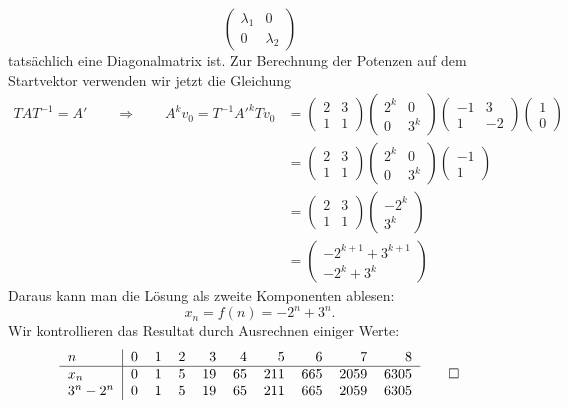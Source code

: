 \begin{loesung}
\[\begin{pmatrix}
\lambda_1&0\\
0&\lambda_2
\end{pmatrix}
\]
tatsächlich eine Diagonalmatrix ist.
Zur Berechnung der Potenzen auf dem Startvektor verwenden wir jetzt die 
Gleichung
\begin{align*}
TAT^{-1}
=
A'
\qquad\Rightarrow\qquad
A^kv_0
=
T^{-1}A'^kTv_0
&=
\begin{pmatrix}
2&3\\
1&1
\end{pmatrix}
\begin{pmatrix}
2^k& 0\\
 0 &3^k
\end{pmatrix}
\begin{pmatrix}
-1& 3\\
 1&-2
\end{pmatrix}
\begin{pmatrix}
1\\0
\end{pmatrix}
\\
&=
\begin{pmatrix}
2&3\\
1&1
\end{pmatrix}
\begin{pmatrix}
2^k& 0\\
 0 &3^k
\end{pmatrix}
\begin{pmatrix}
-1\\1
\end{pmatrix}
\\
&=
\begin{pmatrix}
2&3\\
1&1
\end{pmatrix}
\begin{pmatrix}
-2^k\\
 3^k
\end{pmatrix}
\\
&=
\begin{pmatrix}
-2^{k+1}+3^{k+1}\\
-2^k+3^k
\end{pmatrix}
\end{align*}
Daraus kann man die Lösung als zweite Komponenten ablesen:
\[
x_n=f(n)=-2^n+3^n.
\]
Wir kontrollieren das Resultat durch Ausrechnen einiger Werte:
\[
\begin{tabular}{l|rrrrrrrrr}
$n$&0&1&2&3&4&5&6&7&8\\
\hline
$x_n$&0&1&5&19&65&211&665&2059&6305\\
$3^n-2^n$&0&1&5&19&65&211&665&2059&6305\\
\end{tabular}
\qedhere
\]
\end{loesung}

